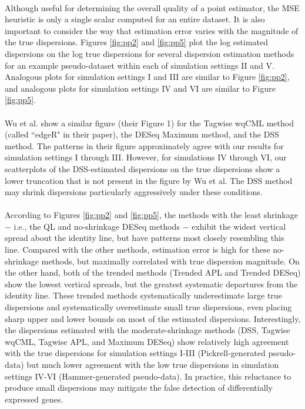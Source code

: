 \documentclass[10pt]{article}
\begin{document}
\paragraph{} \indent Although useful for determining the overall quality of a point estimator, the MSE heuristic is only a single scalar computed for an entire dataset. It is also important to consider the way that estimation error varies with the magnitude of the true dispersions. Figures \ref{fig:pp2} and \ref{fig:pp5} plot the log estimated dispersions on the log true dispersions for several dispersion estimation methods for an example pseudo-dataset within each of simulation settings II and V. Analogous plots for simulation settings I and III are similar to Figure \ref{fig:pp2}, and analogous plots for simulation settings IV and VI are similar to Figure \ref{fig:pp5}. 



 \paragraph{} \indent Wu et al. \cite{dss} show a similar figure (their Figure 1) for the Tagwise wqCML method (called ``edgeR" in their paper), the DESeq Maximum method, and the DSS method. The patterns in their figure approximately agree with our results for simulation settings I through III. However, for simulations IV through VI, our scatterplots of the DSS-estimated dispersions on the true dispersions show a lower truncation that is not present in the figure by Wu et al. The DSS method may shrink dispersions particularly aggressively under these conditions. 





\paragraph{} \indent According to Figures \ref{fig:pp2} and \ref{fig:pp5}, the methods with the least shrinkage $-$ i.e., the QL and no-shrinkage DESeq methods $-$ exhibit the widest vertical spread about the identity line, but have patterns most closely resembling this line. Compared with the other methods, estimation error is high for these no-shrinkage methods, but maximally correlated with true dispersion magnitude. On the other hand, both of the trended methods (Trended APL and Trended DESeq) show the lowest vertical spreads, but the greatest systematic departures from the identity line. These trended methods systematically underestimate large true dispersions and systematically overestimate small true dispersions, even placing sharp upper and lower bounds on most of the estimated dispersions. Interestingly, the dispersions estimated with the moderate-shrinkage methods (DSS, Tagwise wqCML, Tagwise APL, and Maximum DESeq) show relatively high agreement with the true dispersions for simulation settings I-III (Pickrell-generated pseudo-data) but much lower agreement with the low true dispersions in simulation settings IV-VI (Hammer-generated pseudo-data). In practice, this reluctance to produce small dispersions may mitigate the false detection of differentially expressed genes.
\end{document}

